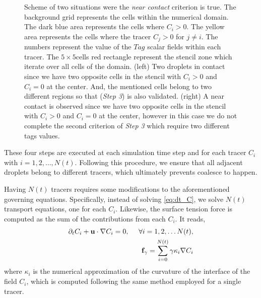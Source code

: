 \begin{figure}
    \caption{Scheme of two situations were the \textit{near contact} criterion is true. 
    The background grid represents the cells within the numerical domain. 
    The dark blue area represents the cells where $C_i > 0$.
    The yellow area represents the cells where the tracer $C_j > 0$ for $j\neq i$. 
    The numbers represent the value of the $Tag$ scalar fields within each tracer.
    The $5\times 5$cells red rectangle represent the stencil zone which iterate over all cells of the domain.  
    (left) Two droplets in contact since we have two opposite cells in the stencil with $C_i > 0$ and $C_i=0$ at the center.
    And, the mentioned cells belong to two different regions so that (\textit{Step 3}) is also validated.  
    (right) A near contact is observed since we have two opposite cells in the stencil with $C_i > 0$ and $C_i=0$ at the center, however in this case we do not complete the second criterion of \textit{Step 3} which require two different tags values. 
    }
    \label{fig:criterion}
\end{figure}
These four steps are executed at each simulation time step and for each tracer $C_i$ with $i = 1, 2, \ldots, N(t)$.
Following this procedure, we ensure that all adjacent droplets belong to different tracers, which ultimately prevents coalesce to happen. 

Having $N(t)$ tracers requires some modifications to the aforementioned governing equations. 
Specifically, instead of solving \ref{eq:dt_C}, we solve $N(t)$ transport equations, one for each $C_i$.
Likewise, the surface tension force is computed as the sum of the contributions from each $C_i$.
It reads,  
\begin{align*}
    \partial_t C_i + \textbf{u}\cdot\mathbf{\nabla} C_i = 0,
    \ \  \ \ \forall i = 1,2,\ldots N(t),\\
    \textbf{f}_\gamma 
    = \sum_{i=0}^{N(t)} \gamma \kappa_i \mathbf{\nabla} C_i
\end{align*}
where $\kappa_i$ is the numerical approximation of the curvature of the interface of the field $C_i$, which is computed following the same method employed for a single tracer. 

